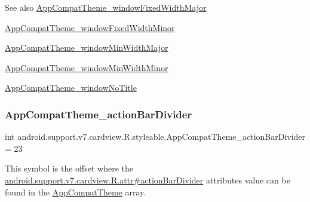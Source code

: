 \begin{DoxySeeAlso}{See also}
\hyperlink{classandroid_1_1support_1_1v7_1_1cardview_1_1R_1_1styleable_a37df104b2e08a0fd323610c8ceb0e98a}{App\+Compat\+Theme\+\_\+window\+Fixed\+Width\+Major} 

\hyperlink{classandroid_1_1support_1_1v7_1_1cardview_1_1R_1_1styleable_a945c5aca64da7f328f2b9028ae826f73}{App\+Compat\+Theme\+\_\+window\+Fixed\+Width\+Minor} 

\hyperlink{classandroid_1_1support_1_1v7_1_1cardview_1_1R_1_1styleable_a3d9fe7753815eb3cf40acf6790e1dd68}{App\+Compat\+Theme\+\_\+window\+Min\+Width\+Major} 

\hyperlink{classandroid_1_1support_1_1v7_1_1cardview_1_1R_1_1styleable_aa1098644aec6afc914db566e8faa7357}{App\+Compat\+Theme\+\_\+window\+Min\+Width\+Minor} 

\hyperlink{classandroid_1_1support_1_1v7_1_1cardview_1_1R_1_1styleable_af1f90e0bb899d8d3fc975f88951bf9c2}{App\+Compat\+Theme\+\_\+window\+No\+Title} 
\end{DoxySeeAlso}
\mbox{\label{classandroid_1_1support_1_1v7_1_1cardview_1_1R_1_1styleable_ac34be2954e08817451f01ab1463f255e}} 
\subsubsection{\texorpdfstring{App\+Compat\+Theme\+\_\+action\+Bar\+Divider}{AppCompatTheme\_actionBarDivider}}
{\footnotesize\ttfamily int android.\+support.\+v7.\+cardview.\+R.\+styleable.\+App\+Compat\+Theme\+\_\+action\+Bar\+Divider = 23\hspace{0.3cm}{\ttfamily [static]}}

This symbol is the offset where the \hyperlink{classandroid_1_1support_1_1v7_1_1cardview_1_1R_1_1attr_a46540c31785eb38b5f429ff0d328db89}{android.\+support.\+v7.\+cardview.\+R.\+attr\#action\+Bar\+Divider} attribute\textquotesingle{}s value can be found in the \hyperlink{classandroid_1_1support_1_1v7_1_1cardview_1_1R_1_1styleable_a52e6f69f954ecc2622d72c0b4d298938}{App\+Compat\+Theme} array.

